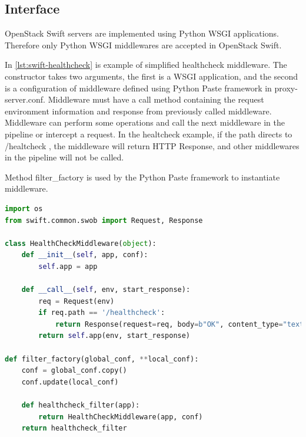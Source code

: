     \subsection{Interface}
    OpenStack Swift servers are implemented using Python WSGI applications. Therefore only Python WSGI middlewares are accepted in OpenStack Swift.

    In \ref{lst:swift-healthcheck} is example of simplified healthcheck middleware. The constructor takes two arguments, the first is a WSGI application, and the second is a configuration of middleware defined using Python Paste framework in proxy-server.conf. Middleware must have a call method containing the request environment information and response from previously called middleware. Middleware can perform some operations and call the next middleware in the pipeline or intercept a request. In the healtcheck example, if the path directs to /healtcheck , the middleware will return HTTP Response, and other middlewares in the pipeline will not be called.

    Method filter\_factory is used by the Python Paste framework to instantiate middleware.

\begin{lstlisting}[language=Python, style=pythonStyle, caption=Example of healthcheck middleware in OpenStack Swift, label=lst:swift-healthcheck]
import os
from swift.common.swob import Request, Response

class HealthCheckMiddleware(object):
    def __init__(self, app, conf):
        self.app = app

    def __call__(self, env, start_response):
        req = Request(env)
        if req.path == '/healthcheck':
            return Response(request=req, body=b"OK", content_type="text/plain")(env, start_response)
        return self.app(env, start_response)

def filter_factory(global_conf, **local_conf):
    conf = global_conf.copy()
    conf.update(local_conf)

    def healthcheck_filter(app):
        return HealthCheckMiddleware(app, conf)
    return healthcheck_filter
\end{lstlisting}


